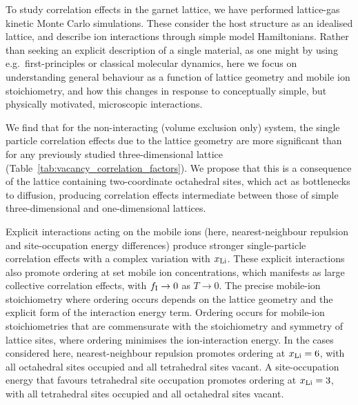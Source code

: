 \documentclass[aps,prb,twocolumn,superscriptaddress,reprint]{revtex4-1}
\newcommand{\xLi}{x_\m{Li}}
\begin{document}
To study correlation effects in the garnet lattice, we have performed  lattice-gas kinetic Monte Carlo simulations.\cite{Morgan_JOSS2017} These consider the host structure as an idealised lattice, and describe ion interactions through simple model Hamiltonians. Rather than seeking an explicit description of a single material, as one might by using e.g.\  first-principles or classical molecular dynamics,\cite{JalemEtAl_ChemMater2013,MeierEtAl_JPhysChemC2014,BurbanoEtAl_PhysRevLett2016} here we focus on understanding general behaviour as a function of lattice geometry and mobile ion stoichiometry, and how this changes in response to conceptually simple, but physically motivated, microscopic interactions.

We find that for the non-interacting (volume exclusion only) system, the single particle correlation effects due to the lattice geometry are more significant than for any previously studied three-dimensional lattice (Table~\ref{tab:vacancy_correlation_factors}). We propose that this is a consequence of the lattice containing two-coordinate octahedral sites, which act as bottlenecks to diffusion, producing correlation effects intermediate between those of simple three-dimensional and one-dimensional lattices. 

Explicit interactions acting on the mobile ions (here, nearest-neighbour repulsion and site-occupation energy differences) produce stronger single-particle correlation effects with a complex variation with $\xLi$. These explicit interactions also promote ordering at set mobile ion concentrations, which manifests as large collective correlation effects, with $f_{\mathrm{I}}\to0$ as $T\to0$.\cite{Murch_SolStatIonics1982} The precise mobile-ion stoichiometry where ordering occurs depends on the lattice geometry and the explicit form of the interaction energy term. Ordering occurs for mobile-ion stoichiometries that are commensurate with the stoichiometry and symmetry of lattice sites, where ordering minimises the ion-interaction energy. In the cases considered here, nearest-neighbour repulsion promotes ordering at $\xLi=6$, with all octahedral sites occupied and all tetrahedral sites vacant. A site-occupation energy that favours tetrahedral site occupation promotes ordering at $\xLi=3$, with all tetrahedral sites occupied and all octahedral sites vacant. 
\end{document}
